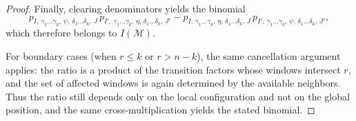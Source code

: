 \documentclass[11pt, a4paper]{article}
\numberwithin{equation}{section}
\theoremstyle{plain}
\theoremstyle{definition}
\begin{document}
\begin{proof}
Finally, clearing denominators yields the binomial
\[
p_{I,\,\gamma_1\ldots\gamma_k,\,\psi,\,\delta_1\ldots\delta_k,\,J}\,
p_{I',\,\gamma_1\ldots\gamma_k,\,\eta,\,\delta_1\ldots\delta_k,\,J'}
-p_{I,\,\gamma_1\ldots\gamma_k,\,\eta,\,\delta_1\ldots\delta_k,\,J}\,
p_{I',\,\gamma_1\ldots\gamma_k,\,\psi,\,\delta_1\ldots\delta_k,\,J'},
\]
which therefore belongs to $I(\mathcal{M})$.

For boundary cases (when $r\le k$ or $r>n-k$), the same cancellation argument applies:
the ratio is a product of the transition factors whose windows intersect $r$, and the set of
affected windows is again determined by the available neighbors.
Thus the ratio still depends only on the local configuration and not on the global position,
and the same cross-multiplication yields the stated binomial.
\end{proof}
\end{document}
